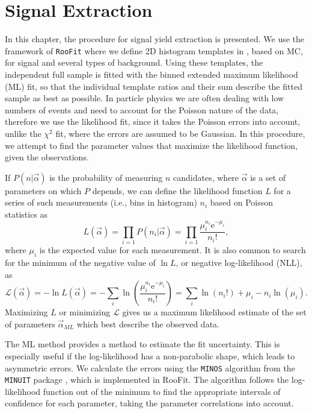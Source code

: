 \chapter{Signal Extraction}
In this chapter, the procedure for signal yield extraction is presented. We use the framework of \texttt{RooFit} \cite{verkerke2006roofit} where we define 2D histogram templates in \vars, based on MC, for signal and several types of background. Using these templates, the independent full sample is fitted with the binned extended maximum likelihood (ML) fit, so that the individual template ratios and their sum describe the fitted sample as best as possible. In particle physics we are often dealing with low numbers of events and need to account for the Poisson nature of the data, therefore we use the likelihood fit, since it takes the Poisson errors into account, unlike the $\chi^2$ fit, where the errors are assumed to be Gaussian. In this procedure, we attempt to find the parameter values that maximize the likelihood function, given the observations.

If $P(n\vert\vec \alpha)$ is the probability of measuring $n$ candidates, where $\vec \alpha$ is a set of parameters on which $P$ depends, we can define the likelihood function $L$ for a series of such measurements (i.e., bins in histogram) $n_i$ based on Poisson statistics as
\begin{equation}
\label{eq:ML}
L(\vec \alpha) = \prod_{i=1} P(n_i|\vec \alpha) = \prod_{i=1} \frac{\mu_i^{n_i}\mathrm{e}^{-\mu_i}}{n_i!},
\end{equation}
where $\mu_i$ is the expected value for each measurement. It is also common to search for the minimum of the negative value of $\ln L$, or negative log-likelihood (NLL), as
\begin{equation}
\label{eq:NLL}
\mathcal{L}(\vec \alpha) = -\ln L(\vec \alpha) = -\sum_{i}\ln \left(\frac{\mu_i^{n_i}\mathrm{e}^{-\mu_i}}{n_i!}\right) = \sum_{i}\ln(n_i!) + \mu_i - n_i\ln(\mu_i).
\end{equation}
Maximizing $L$ or minimizing $\mathcal{L}$ gives us a maximum likelihood estimate of the set of parameters $\vec \alpha_{ML}$ which best describe the observed data. 

The ML method provides a method to estimate the fit uncertainty. This is especially useful if the log-likelihood has a non-parabolic shape, which leads to asymmetric errors. We calculate the errors using the \texttt{MINOS} algorithm from the \texttt{MINUIT} package \cite{James:1994vla}, which is implemented in RooFit. The algorithm follows the log-likelihood function out of the minimum to find the appropriate intervals of confidence for each parameter, taking the parameter correlations into account. 

